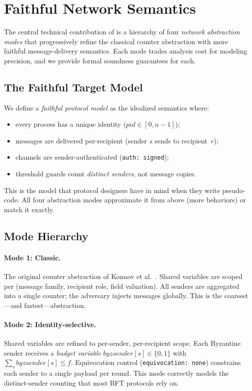 \section{Faithful Network Semantics}\label{sec:semantics}

The central technical contribution of \tarsier{} is a hierarchy of four
\emph{network abstraction modes} that progressively refine the classical
counter abstraction with more faithful message-delivery semantics.  Each
mode trades analysis cost for modeling precision, and we provide formal
soundness guarantees for each.

\subsection{The Faithful Target Model}

We define a \emph{faithful protocol model} as the idealized semantics
where:
\begin{itemize}
  \item every process has a unique identity
    ($\mathit{pid} \in [0, n{-}1]$);
  \item messages are delivered per-recipient (sender $s$ sends to
    recipient~$r$);
  \item channels are sender-authenticated (\texttt{auth: signed});
  \item threshold guards count \emph{distinct senders}, not message
    copies.
\end{itemize}
This is the model that protocol designers have in mind when they write
pseudo-code.  All four abstraction modes approximate it from above (more
behaviors) or match it exactly.

\subsection{Mode Hierarchy}

\paragraph{Mode 1: Classic.}
The original counter abstraction of Konnov et
al.~\cite{KonnovVW2015}.  Shared variables are scoped per (message
family, recipient role, field valuation).  All senders are aggregated
into a single counter; the adversary injects messages globally.  This
is the coarsest---and fastest---abstraction.

\paragraph{Mode 2: Identity-selective.}
Shared variables are refined to per-sender, per-recipient scope.  Each
Byzantine sender receives a \emph{budget variable}
$\mathit{byzsender}[s] \in \{0,1\}$ with
$\sum_s \mathit{byzsender}[s] \leq f$.  Equivocation control
(\texttt{equivocation: none}) constrains each sender to a single
payload per round.  This mode correctly models the distinct-sender
counting that most BFT protocols rely on.


